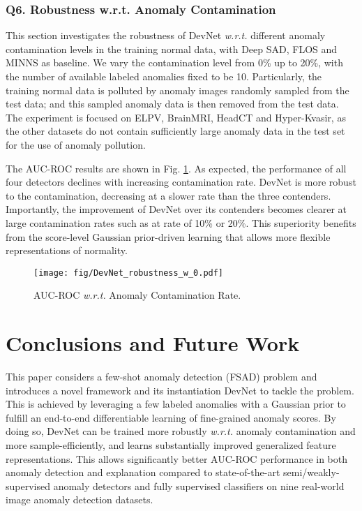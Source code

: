 \documentclass[10pt,journal,compsoc]{IEEEtran}
\begin{document}
\subsubsection{Q6. Robustness w.r.t. Anomaly Contamination}

This section investigates the robustness of DevNet \textit{w.r.t.} different anomaly contamination levels in the training normal data, with Deep SAD, FLOS and MINNS as baseline. We vary the contamination level from 0\% up to 20\%, with the number of available labeled anomalies fixed to be 10. Particularly, the training normal data is polluted by anomaly images randomly sampled from the test data; and this sampled anomaly data is then removed from the test data. The experiment is focused on ELPV, BrainMRI, HeadCT and Hyper-Kvasir, as the other datasets do not contain sufficiently large anomaly data in the test set for the use of anomaly pollution.

The AUC-ROC results are shown in Fig. \ref{fig:image_robustness}. As expected, the performance of all four detectors declines with increasing contamination rate. DevNet is more robust to the contamination, decreasing at a slower rate than the three contenders. Importantly, the improvement of DevNet over its contenders becomes clearer at large contamination rates such as at rate of 10\% or 20\%. This superiority benefits from the score-level Gaussian prior-driven learning that allows more flexible representations of normality.

\begin{figure}[h!]
  \centering
    \texttt{[image: fig/DevNet\_robustness\_w\_0.pdf]}
  \caption{AUC-ROC \textit{w.r.t.} Anomaly Contamination Rate.}
  \label{fig:image_robustness}
\end{figure}




\section{Conclusions and Future Work}

This paper considers a few-shot anomaly detection (FSAD) problem and introduces a novel framework and its instantiation DevNet to tackle the problem. This is achieved by leveraging a few labeled anomalies with a Gaussian prior to fulfill an end-to-end differentiable learning of fine-grained anomaly scores. By doing so, DevNet can be trained more robustly \textit{w.r.t.} anomaly contamination and more sample-efficiently, and learns substantially improved generalized feature representations. This allows significantly better AUC-ROC performance in both anomaly detection and explanation compared to state-of-the-art semi/weakly-supervised anomaly detectors and fully supervised classifiers on nine real-world image anomaly detection datasets. 
\end{document}
